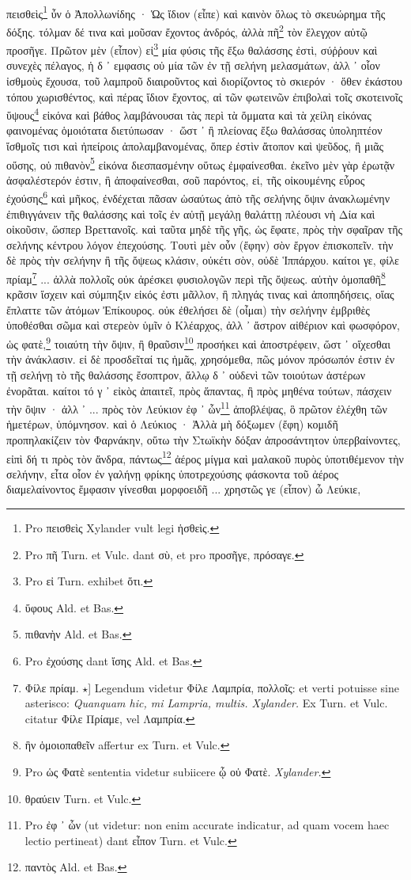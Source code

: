 \documentclass[a4paper, 11pt, oneside, polutonikogreek, german]{article}
\begin{document}
\paragraph{}
πεισθεὶς\footnote{Pro πεισθεὶς Xylander vult legi ἡσθεὶς.} ὖν ὁ Ἀπολλωνίδης · Ὡς ἴδιον (εἶπε) καὶ καινὸν ὅλως τὸ σκευώρημα τῆς δόξης. τόλμαν δέ τινα καὶ μοῦσαν ἔχοντος ἀνδρός, ἀλλὰ πῆ\footnote{Pro πῆ Turn. et Vulc. dant σὺ, et pro προσῆγε, πρόσαγε.} τὸν ἔλεγχον αὐτῷ προσῆγε. Πρῶτον μὲν (εἶπον) εἰ\footnote{Pro εἰ Turn. exhibet ὅτι.} μία φύσις τῆς ἔξω θαλάσσης ἐστὶ, σύῤῥουν καὶ συνεχὲς πέλαγος, ἡ δ ᾽ εμφασις οὐ μία τῶν ἐν τῇ σελήνη μελασμάτων, ἀλλ ᾽ οἷον ἰσθμοὺς ἔχουσα, τοῦ λαμπροῦ διαιροῦντος καὶ διορίζοντος τὸ σκιερόν · ὅθεν ἐκάστου τόπου χωρισθέντος, καὶ πέρας ἴδιον ἔχοντος, αἱ τῶν φωτεινῶν ἐπιβολαὶ τοῖς σκοτεινοῖς ὕψους\footnote{ὕφους Ald. et Bas.} εἰκόνα καὶ βάθος λαμβάνουσαι τὰς περὶ τὰ ὄμματα καὶ τὰ χείλη εἰκόνας φαινομένας ὁμοιότατα διετύπωσαν · ὥστ ᾽ ἢ πλείονας ἔξω θαλάσσας ὑποληπτέον ἴσθμοῖς τισι καὶ ἠπείροις ἀπολαμβανομένας, ὅπερ ἐστὶν ἄτοπον καὶ ψεῦδος, ἢ μιᾶς οὔσης, οὐ πιθανὸν\footnote{πιθανὴν Ald. et Bas.} εἰκόνα διεσπασμένην οὕτως ἐμφαίνεσθαι. ἐκεῖνο μὲν γὰρ ἐρωτᾷν ἀσφαλέστερόν ἐστιν, ἢ ἀποφαίνεσθαι, σοῦ παρόντος, εἰ, τῆς οἰκουμένης εὖρος ἐχούσης\footnote{Pro ἐχούσης dant ἴσης Ald. et Bas.} καὶ μῆκος, ἐνδέχεται πᾶσαν ὡσαύτως ἀπὸ τῆς σελήνης ὄψιν ἀνακλωμένην ἐπιθιγγάνειν τῆς θαλάσσης καὶ τοῖς ἐν αὐτῇ μεγάλῃ θαλάττῃ πλέουσι νὴ Δία καὶ οἰκοῦσιν, ὥσπερ Βρεττανοῖς. καὶ ταῦτα μηδὲ τῆς γῆς, ὡς ἔφατε, πρὸς τὴν σφαῖραν τῆς σελήνης κέντρου λόγον ἐπεχούσης. Τουτὶ μὲν οὖν (ἔφην) σὸν ἔργον ἐπισκοπεῖν. τὴν δὲ πρὸς τὴν σελήνην ἢ τῆς ὄψεως κλάσιν, οὐκέτι σὸν, οὐδὲ Ἱππάρχου. καίτοι γε, φίλε πρίαμ\footnote{Φίλε πρίαμ. $\star$] Legendum videtur Φίλε Λαμπρία, πολλοῖς: et verti potuisse sine asterisco: \emph{Quanquam hic, mi Lampria, multis. Xylander.} Ex Turn. et Vulc. citatur Φίλε Πρίαμε, vel Λαμπρία.} ... ἀλλὰ πολλοῖς οὐκ ἀρέσκει φυσιολογῶν περὶ τῆς ὄψεως. αὐτὴν ὁμοπαθῆ\footnote{ἣν ὁμοιοπαθεῖν affertur ex Turn. et Vulc.} κρᾶσιν ἴσχειν καὶ σύμπηξιν εἰκός ἐστι μᾶλλον, ἢ πληγάς τινας καὶ ἀποπηδήσεις, οἵας ἔπλαττε τῶν ἀτόμων Ἐπίκουρος. οὐκ ἐθελήσει δὲ (οἶμαι) τὴν σελήνην ἐμβριθὲς ὑποθέσθαι σῶμα καὶ στερεὸν ὑμῖν ὁ Κλέαρχος, ἀλλ ᾽ ἄστρον αἰθέριον καὶ φωσφόρον, ὡς φατὲ,\footnote{Pro ὡς Φατὲ sententia videtur subiicere ᾧ οὐ Φατὲ. \emph{Xylander.}} τοιαύτη τὴν ὄψιν, ἢ θραῦσιν\footnote{θραύειν Turn. et Vulc.} προσήκει καὶ ἀποστρέφειν, ὥστ ᾽ οἴχεσθαι τὴν ἀνάκλασιν. εἰ δὲ προσδεῖταί τις ἡμᾶς, χρησόμεθα, πῶς μόνον πρόσωπόν ἐστιν ἐν τῇ σελήνῃ τὸ τῆς θαλάσσης ἔσοπτρον, ἄλλῳ δ ᾽ οὐδενὶ τῶν τοιούτων ἀστέρων ἐνορᾶται. καίτοι τό γ ᾽ εἰκὸς ἀπαιτεῖ, πρὸς ἅπαντας, ἢ πρὸς μηθένα τούτων, πάσχειν τὴν ὂψιν · ἀλλ ᾽ ... πρὸς τὸν Λεύκιον ἐφ ᾽ ὧν\footnote{Pro ἐφ ᾽ ὧν (ut videtur: non enim accurate indicatur, ad quam vocem haec lectio pertineat) dant εἶπον Turn. et Vulc.} ἀποβλέψας, ὃ πρῶτον ἐλέχθη τῶν ἡμετέρων, ὑπόμνησον. καὶ ὁ Λεύκιος · Ἀλλὰ μὴ δόξωμεν (ἔφη) κομιδῆ προπηλακίζειν τὸν Φαρνάκην, οὕτω τὴν Στωϊκὴν δόξαν ἀπροσάντητον ὑπερβαίνοντες, εἰπὶ δή τι πρὸς τὸν ἄνδρα, πάντως\footnote{παντὸς Ald. et Bas.} ἀέρος μίγμα καὶ μαλακοῦ πυρὸς ὑποτιθέμενον τὴν σελήνην, εἶτα οἷον ἐν γαλήνῃ φρίκης ὑποτρεχούσης φάσκοντα τοῦ ἀέρος διαμελαίνοντος ἔμφασιν γίνεσθαι μορφοειδῆ ... χρηστῶς γε (εἶπον) ὦ Λεύκιε, 
\end{document}
